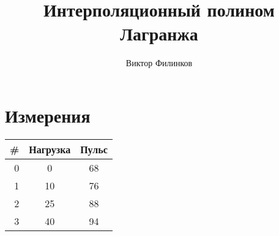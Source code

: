 \documentclass[oneside,final,14pt]{extreport}
\begin{document}
\title{Интерполяционный полином Лагранжа}
\author{Виктор Филинков}
\maketitle

\chapter*{Измерения}
\begin{table}[pht]
	\centering
	\begin{tabular}{|r | c | c|}
		\hline \textbf{\#} &  \textbf{Нагрузка} & \textbf{Пульс} \\ \hline
		0 & 0	&	68	\\ \hline
		1 & 10	&	76	\\ \hline
		2 & 25	&	88	\\ \hline
		3 & 40	&	94	\\ \hline
	\end{tabular}
	\label{measurements}
\end{table}
\end{document}
